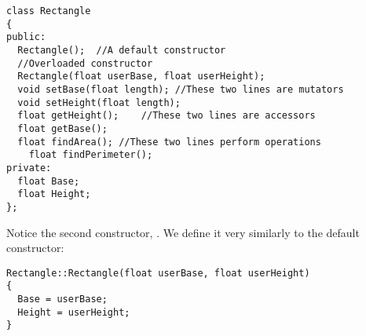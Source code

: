 \noindent\begin{minipage}{\linewidth}\begin{lstlisting}
class Rectangle
{
public: 
  Rectangle();	//A default constructor
  //Overloaded constructor
  Rectangle(float userBase, float userHeight);	
  void setBase(float length); //These two lines are mutators
  void setHeight(float length);
  float getHeight();	//These two lines are accessors
  float getBase();	
  float findArea();	//These two lines perform operations
	float findPerimeter();
private:
  float Base;
  float Height;
};
\end{lstlisting}\end{minipage}

Notice the second constructor, . 
We define it very similarly to the default constructor:

\noindent\begin{minipage}{\linewidth}\begin{lstlisting}
Rectangle::Rectangle(float userBase, float userHeight)
{
  Base = userBase;
  Height = userHeight;
}
\end{lstlisting}\end{minipage}


